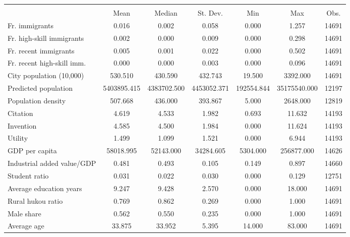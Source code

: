 {
\def\sym#1{\ifmmode^{#1}\else\(^{#1}\)\fi}
\begin{tabular}{l*{1}{cccccc}}
\toprule
                    &\multicolumn{6}{c}{}                                                         \\
                    &        Mean&      Median&    St. Dev.&         Min&         Max&        Obs.\\
\midrule
Fr. immigrants      &       0.016&       0.002&       0.058&       0.000&       1.257&       14691\\
Fr. high-skill immigrants&       0.002&       0.000&       0.009&       0.000&       0.298&       14691\\
Fr. recent immigrants&       0.005&       0.001&       0.022&       0.000&       0.502&       14691\\
Fr. recent high-skill imm.&       0.000&       0.000&       0.003&       0.000&       0.096&       14691\\
City population (10,000)&     530.510&     430.590&     432.743&      19.500&    3392.000&       14691\\
Predicted population& 5403895.415& 4383702.500& 4453052.371&  192554.844&35175540.000&       12197\\
Population density  &     507.668&     436.000&     393.867&       5.000&    2648.000&       12819\\
Citation            &       4.619&       4.533&       1.982&       0.693&      11.632&       14193\\
Invention           &       4.585&       4.500&       1.984&       0.000&      11.624&       14193\\
Utility             &       1.499&       1.099&       1.521&       0.000&       6.944&       14193\\
GDP per capita      &   58018.995&   52143.000&   34284.605&    5304.000&  256877.000&       14626\\
Industrial added value/GDP&       0.481&       0.493&       0.105&       0.149&       0.897&       14660\\
Student ratio       &       0.031&       0.022&       0.030&       0.000&       0.129&       12751\\
Average education years&       9.247&       9.428&       2.570&       0.000&      18.000&       14691\\
Rural hukou ratio   &       0.769&       0.862&       0.269&       0.000&       1.000&       14691\\
Male share          &       0.562&       0.550&       0.235&       0.000&       1.000&       14691\\
Average age         &      33.875&      33.952&       5.395&      14.000&      83.000&       14691\\
\bottomrule
\end{tabular}
}

